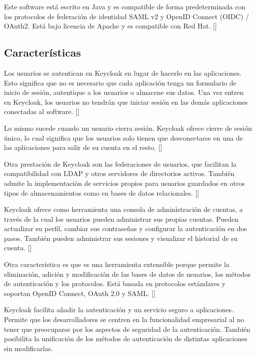Este software está escrito en Java y es compatible de forma predeterminada con los protocolos de federación de identidad SAML v2 y OpenID Connect (OIDC) / OAuth2. Está bajo licencia de Apache y es compatible con Red Hat. [\cite{KeycloakDoc}]

	\subsection{Características}
	Los usuarios se autentican en Keycloak en lugar de hacerlo en las aplicaciones. Esto significa que no es necesario que cada aplicación tenga un formulario de inicio de sesión, autentique a los usuarios o almacene sus datos. Una vez entren en Keycloak, los usuarios no tendrán que iniciar sesión en las demás aplicaciones conectadas al software. [\cite{KeycloakDoc}]
	
	Lo mismo sucede cuando un usuario cierra sesión. Keycloak ofrece cierre de sesión único, lo cual significa que los usuarios solo tienen que desconectarse en una de las aplicaciones para salir de su cuenta en el resto. [\cite{KeycloakDoc}]
	
	Otra prestación de Keycloak son las federaciones de usuarios, que facilitan la compatibilidad con LDAP y otros servidores de directorios activos. También admite la implementación de servicios propios para usuarios guardados en otros tipos de almacenamientos como en bases de datos relacionales. [\cite{KeycloakDoc}]
	
	Keycloak ofrece como herramienta una consola de administración de cuentas, a través de la cual los usuarios pueden administrar sus propias cuentas. Pueden actualizar su perfil, cambiar sus contraseñas y configurar la autenticación en dos pasos. También pueden administrar sus sesiones y visualizar el historial de su cuenta. [\cite{KeycloakDoc}]
	
	Otra característica es que es una herramienta extensible porque permite la eliminación, adición y modificación de las bases de datos de usuarios, los métodos de autenticación y los protocolos. Está basada en protocolos estándares y soportan OpenID Connect, OAuth 2.0 y SAML. [\cite{KeycloakDoc}]
	
	Keycloak facilita añadir la autenticación y un servicio seguro a aplicaciones. Permite que los desarrolladores se centren en la funcionalidad empresarial al no tener que preocuparse por los aspectos de seguridad de la autenticación. También posibilita la unificación de los métodos de autenticación de distintas aplicaciones sin modificarlas.
	
